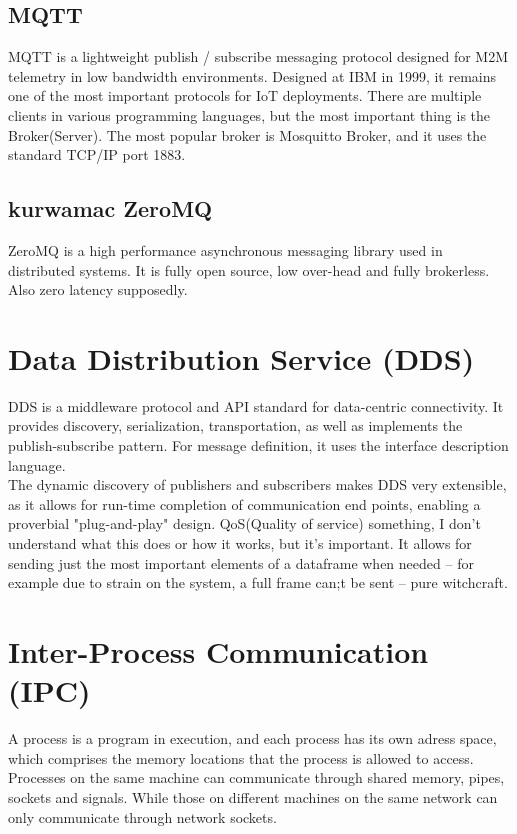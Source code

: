 \subsection{MQTT}
MQTT is a lightweight publish / subscribe messaging protocol designed for M2M telemetry in low bandwidth environments. Designed at IBM in 1999, it remains one of the most important protocols for IoT deployments. There are multiple clients in various programming languages, but the most important thing is the Broker(Server). The most popular broker is Mosquitto Broker, and it uses the standard TCP/IP port 1883.

\subsection{kurwamac ZeroMQ}
ZeroMQ is a high performance asynchronous messaging library used in distributed systems. It is fully open source, low over-head and fully brokerless. Also zero latency supposedly.


\section{Data Distribution Service (DDS)}
DDS is a middleware protocol and API standard for data-centric connectivity. It provides discovery, serialization, transportation, as well as implements the publish-subscribe pattern. For message definition, it uses the interface description language. \\
The dynamic discovery of publishers and subscribers makes DDS very extensible, as it allows for run-time completion of communication end points, enabling a proverbial "plug-and-play" design.
QoS(Quality of service) something, I don't understand what this does or how it works, but it's important. It allows for sending just the most important elements of a dataframe when needed -- for example due to strain on the system, a full frame can;t be sent -- pure witchcraft.

\section{Inter-Process Communication (IPC)}
{
    A process is a program in execution, and each process has its own adress space, which comprises the memory locations that the process is allowed to access.
}
{
    Processes on the same machine can communicate through shared memory, pipes, sockets and signals. While those on different machines on the same network can only communicate through network sockets.
}


